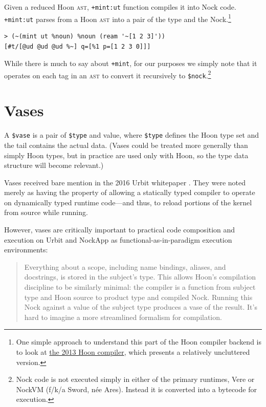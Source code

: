 \documentclass[twoside]{article}
\begin{document}
Given a reduced Hoon \textsc{ast}, \lstinline[style=inlinecode]{+mint:ut} function compiles it into Nock code.  \lstinline[style=inlinecode]{+mint:ut} parses from a Hoon \textsc{ast} into a pair of the type and the Nock.\footnote{One simple approach to understand this part of the Hoon compiler backend is to look at \href{https://github.com/urbit/archaeology/blob/6b2ce202207b9bb3f4e65fc1ea9a2fb434396dd4/urb/zod/arvo/hoon.hoon}{the 2013 Hoon compiler}, which presents a relatively uncluttered version.}

\begin{lstlisting}[style=listingblock]
> (~(mint ut %noun) %noun (ream '~[1 2 3]'))
[#t/[@ud @ud @ud %~] q=[%1 p=[1 2 3 0]]]
\end{lstlisting}

\noindent
While there is much to say about \lstinline[style=inlinecode]{+mint}, for our purposes we simply note that it operates on each tag in an \textsc{ast} to convert it recursively to \lstinline[style=inlinecode]{$nock}.\footnote{Nock code is not executed simply in either of the primary runtimes, Vere or NockVM (f/k/a Sword, née Ares).  Instead it is converted into a bytecode for execution.}

\section{Vases}

A \lstinline[style=inlinecode]{$vase} is a pair of \lstinline[style=inlinecode]{$type} and value, where \lstinline[style=inlinecode]{$type} defines the Hoon type set and the tail contains the actual data.  (Vases could be treated more generally than simply Hoon types, but in practice are used only with Hoon, so the type data structure will become relevant.)

Vases received bare mention in the 2016 Urbit whitepaper \citep{Whitepaper}.  They were noted merely as having the property of allowing a statically typed compiler to operate on dynamically typed runtime code—and thus, to reload portions of the kernel from source while running.

However, vases are critically important to practical code composition and execution on Urbit and NockApp as functional-as-in-paradigm execution environments:

\begin{quote}
Everything about a scope, including name bindings, aliases, and docstrings, is stored in the subject's type. This allows Hoon's compilation discipline to be similarly minimal: the compiler is a function from subject type and Hoon source to product type and compiled Nock. Running this Nock against a value of the subject type produces a vase of the result. It's hard to imagine a more streamlined formalism for compilation.  \citep{Blackman2020}
\end{quote}
\end{document}
